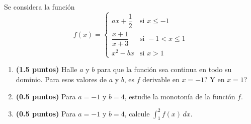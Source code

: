 
Se considera la función
\[
f(x)=\begin{cases}
ax+\dfrac{1}{2} & \text{si }x\leq -1\\
\dfrac{x+1}{x+3} & \text{si }-1<x\leq 1\\
x^2-bx & \text{si }x>1
\end{cases}
\]
\begin{enumerate}[label=\alph*)]
  \item \textbf{(1.5 puntos)} Halle $a$ y $b$ para que la función sea continua
  en todo su dominio. Para esos valores de $a$ y $b$,
  \textquestiondown{}es $f$ derivable en $x=-1$? \textquestiondown{}Y en $x=1$?
  \item \textbf{(0.5 puntos)} Para $a=-1$ y $b=4$, estudie la monotonía
  de la función $f$.
  \item \textbf{(0.5 puntos)} Para $a=-1$ y $b=4$, calcule
  $\displaystyle\int_1^2 f(x)\,dx$.
\end{enumerate}
